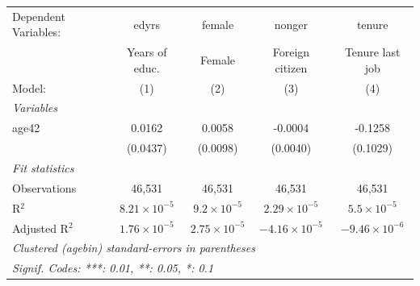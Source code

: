 
\begingroup
\centering
\begin{tabular}{lcccc}
   \tabularnewline \midrule \midrule
   Dependent Variables: & edyrs                 & female                & nonger                 & tenure\\  
                        & Years of educ.        & Female                & Foreign citizen        & Tenure last job \\   
   Model:               & (1)                   & (2)                   & (3)                    & (4)\\  
   \midrule
   \emph{Variables}\\
   age42                & 0.0162                & 0.0058                & -0.0004                & -0.1258\\   
                        & (0.0437)              & (0.0098)              & (0.0040)               & (0.1029)\\   
   \midrule
   \emph{Fit statistics}\\
   Observations         & 46,531                & 46,531                & 46,531                 & 46,531\\  
   R$^2$                & $8.21\times 10^{-5}$  & $9.2\times 10^{-5}$   & $2.29\times 10^{-5}$   & $5.5\times 10^{-5}$\\   
   Adjusted R$^2$       & $1.76\times 10^{-5}$  & $2.75\times 10^{-5}$  & $-4.16\times 10^{-5}$  & $-9.46\times 10^{-6}$\\   
   \midrule \midrule
   \multicolumn{5}{l}{\emph{Clustered (agebin) standard-errors in parentheses}}\\
   \multicolumn{5}{l}{\emph{Signif. Codes: ***: 0.01, **: 0.05, *: 0.1}}\\
\end{tabular}
\par\endgroup


